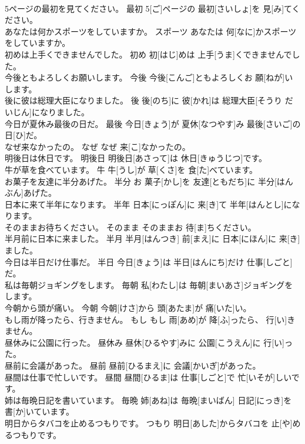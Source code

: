\documentclass[8pt]{extreport}
\begin{document}
\begin{CJK}{UTF8}{min}
\\	5ページの最初を見てください。	最初	5[ご]ページの 最初[さいしょ]を 見[み]てください。	
\\	あなたは何かスポーツをしていますか。	スポーツ	あなたは 何[なに]かスポーツをしていますか。	
\\	初めは上手くできませんでした。	初め	初[はじ]めは 上手[うま]くできませんでした。	
\\	今後ともよろしくお願いします。	今後	今後[こんご]ともよろしくお 願[ねが]いします。	
\\	後に彼は総理大臣になりました。	後	後[のち]に 彼[かれ]は 総理大臣[そうり だいじん]になりました。	
\\	今日が夏休み最後の日だ。	最後	今日[きょう]が 夏休[なつやす]み 最後[さいご]の 日[ひ]だ。	
\\	なぜ来なかったの。	なぜ	なぜ 来[こ]なかったの。	
\\	明後日は休日です。	明後日	明後日[あさって]は 休日[きゅうじつ]です。	
\\	牛が草を食べています。	牛	牛[うし]が 草[くさ]を 食[た]べています。	
\\	お菓子を友達に半分あげた。	半分	お 菓子[かし]を 友達[ともだち]に 半分[はんぶん]あげた。	
\\	日本に来て半年になります。	半年	日本[にっぽん]に 来[き]て 半年[はんとし]になります。	
\\	そのままお待ちください。	そのまま	そのままお 待[ま]ちください。	
\\	半月前に日本に来ました。	半月	半月[はんつき] 前[まえ]に 日本[にほん]に 来[き]ました。	
\\	今日は半日だけ仕事だ。	半日	今日[きょう]は 半日[はんにち]だけ 仕事[しごと]だ。	
\\	私は毎朝ジョギングをします。	毎朝	私[わたし]は 毎朝[まいあさ]ジョギングをします。	
\\	今朝から頭が痛い。	今朝	今朝[けさ]から 頭[あたま]が 痛[いた]い。	
\\	もし雨が降ったら、行きません。	もし	もし 雨[あめ]が 降[ふ]ったら、 行[い]きません。	
\\	昼休みに公園に行った。	昼休み	昼休[ひるやす]みに 公園[こうえん]に 行[い]った。	
\\	昼前に会議があった。	昼前	昼前[ひるまえ]に 会議[かいぎ]があった。	
\\	昼間は仕事で忙しいです。	昼間	昼間[ひるま]は 仕事[しごと]で 忙[いそが]しいです。	
\\	姉は毎晩日記を書いています。	毎晩	姉[あね]は 毎晩[まいばん] 日記[にっき]を 書[か]いています。	
\\	明日からタバコを止めるつもりです。	つもり	明日[あした]からタバコを 止[や]めるつもりです。	

\end{CJK}
\end{document}
